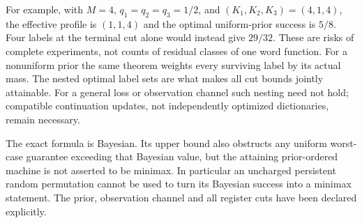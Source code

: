 For example, with $M=4$, $q_1=q_2=q_3=1/2$, and
$(K_1,K_2,K_3)=(4,1,4)$, the effective profile is $(1,1,4)$ and the
optimal uniform-prior success is $5/8$. Four labels at the terminal
cut alone would instead give $29/32$. These are risks of complete
experiments, not counts of residual classes of one word function.
For a nonuniform prior the same theorem weights every surviving label
by its actual mass. The nested optimal label sets are what makes all
cut bounds jointly attainable. For a general loss or observation
channel such nesting need not hold; compatible continuation updates,
not independently optimized dictionaries, remain necessary.

The exact formula is Bayesian. Its upper bound also obstructs any
uniform worst-case guarantee exceeding that Bayesian value, but the
attaining prior-ordered machine is not asserted to be minimax. In
particular an uncharged persistent random permutation cannot be used
to turn its Bayesian success into a minimax statement. The prior,
observation channel and all register cuts have been declared explicitly.

